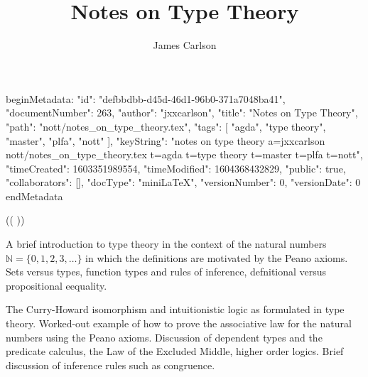 beginMetadata:
{
    "id": "defbbdbb-d45d-46d1-96b0-371a7048ba41",
    "documentNumber": 263,
    "author": "jxxcarlson",
    "title": "Notes on Type Theory",
    "path": "nott/notes_on_type_theory.tex",
    "tags": [
        "agda",
        "type theory",
        "master",
        "plfa",
        "nott"
    ],
    "keyString": "notes on type theory a=jxxcarlson nott/notes_on_type_theory.tex t=agda t=type theory t=master t=plfa t=nott",
    "timeCreated": 1603351989554,
    "timeModified": 1604368432829,
    "public": true,
    "collaborators": [],
    "docType": "miniLaTeX",
    "versionNumber": 0,
    "versionDate": 0
}
endMetadata
\title{ Notes on Type Theory}

\author{James Carlson}

\maketitle

\begin{mathmacro}
\newcommand{\bbN}[0]{\mathbb{N}}
\newcommand{\blah}[0]{\text{\textunderscore}}
\newcommand{\sp}[0]{\space}
\newcommand{\refl}[0]{\mathop{\text{refl}}}
\newcommand{\lhs}[0]{\mathop{\text{LHS}}}
\newcommand{\rhs}[0]{\mathop{\text{RHS}}}
\end{mathmacro}



(( ))


 A brief introduction to type theory in the context of the natural numbers $\mathbb{N} = \{ 0, 1, 2, 3, \ldots \}$ in which the definitions are motivated by the Peano axioms. Sets versus types, function types and rules of inference, defnitional versus propositional eequality.


 The Curry-Howard isomorphism and intuitionistic logic as formulated in type theory.  Worked-out example of how to prove the associative law for the natural numbers using the Peano axioms. Discussion of dependent types and the predicate calculus, the Law of the Excluded Middle, higher order logics. Brief discussion of inference rules such as congruence.


